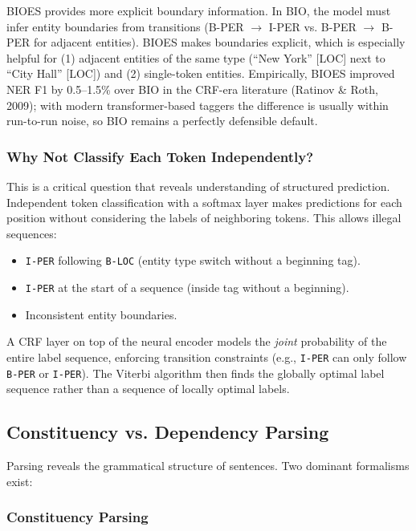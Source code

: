 \begin{keyinsight}
BIOES provides more explicit boundary information. In BIO, the model must infer entity
boundaries from transitions (B-PER $\to$ I-PER vs. B-PER $\to$ B-PER for adjacent
entities). BIOES makes boundaries explicit, which is especially helpful for (1) adjacent
entities of the same type (``New York'' [LOC] next to ``City Hall'' [LOC]) and (2)
single-token entities. Empirically, BIOES improved NER F1 by 0.5--1.5\% over BIO in the
CRF-era literature (Ratinov \& Roth, 2009); with modern transformer-based taggers the
difference is usually within run-to-run noise, so BIO remains a perfectly defensible
default.
\end{keyinsight}

\subsubsection{Why Not Classify Each Token Independently?}

This is a critical question that reveals understanding of structured prediction.
Independent token classification with a softmax layer makes predictions for each position
without considering the labels of neighboring tokens. This allows illegal sequences:
\begin{itemize}
    \item \texttt{I-PER} following \texttt{B-LOC} (entity type switch without a beginning
    tag).
    \item \texttt{I-PER} at the start of a sequence (inside tag without a beginning).
    \item Inconsistent entity boundaries.
\end{itemize}

A CRF layer on top of the neural encoder models the \emph{joint} probability of the
entire label sequence, enforcing transition constraints (e.g., \texttt{I-PER} can only
follow \texttt{B-PER} or \texttt{I-PER}). The Viterbi algorithm then finds the globally
optimal label sequence rather than a sequence of locally optimal labels.

\subsection{Constituency vs. Dependency Parsing}
\label{sec:parsing}

Parsing reveals the grammatical structure of sentences. Two dominant formalisms exist:

\subsubsection{Constituency Parsing}

